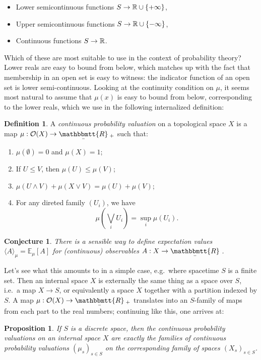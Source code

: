 \documentclass[11pt, oneside, article]{memoir}
\theoremstyle{plain}
\newtheorem{proposition}[theorem]{Proposition}
\newtheorem{conjecture}[theorem]{Conjecture}
\theoremstyle{definition}
\newtheorem{definition}[theorem]{Definition}
\theoremstyle{remark}
\newcommand{\ubar}[1]{\underaccent{\bar}{#1}}
\newcommand{\internal}[1]{\raisebox{-.03ex}{$\mathbbmtt{#1}$}}
\newcommand{\hs}{\hspace{1.1pt}}
\newcommand{\tRR}{\internal{R}\hs}
\newcommand{\tLR}{\ubar{\tRR}\hs}
\begin{document}
\begin{itemize}
\item Lower semicontinuous functions $S \to \mathbb{R} \cup \{+\infty\}$,
\item Upper semicontinuous functions $S \to \mathbb{R} \cup \{-\infty\}$,
\item Continuous functions $S \to \mathbb{R}$.
\end{itemize}

Which of these are most suitable to use in the context of probability theory? Lower reals are easy to bound from below, which matches up with the fact that membership in an open set is easy to witness: the indicator function of an open set is lower semi-continuous. Looking at the continuity condition on $\mu$, it seems most natural to assume that $\mu(x)$ is easy to bound from below, corresponding to the lower reals, which we use in the following internalized definition:

\begin{definition}
A \emph{continuous probability valuation} on a topological space $X$ is a map $\mu : \Open{X} \to \tLR_+$ such that:
\begin{enumerate}
\item $\mu(\emptyset) = 0$ and $\mu(X) = 1$;
\item If $U\leq V$, then $\mu(U) \leq \mu(V)$;
\item $\mu(U \land V) + \mu(X \lor V) = \mu(U) + \mu(V)$;
\item For any direted family $(U_i)$, we have
\[
	\mu\left( \bigvee_i U_i \right) = \sup_i \mu(U_i).
\]
\end{enumerate}
\end{definition}

\begin{conjecture}
There is a sensible way to define expectation values $\langle A \rangle_\mu = \mathbb{E}_\mu[A]$ for (continuous) observables $A : X \to \tLR$.
\end{conjecture}

Let's see what this amounts to in a simple case, e.g.~where spacetime $S$ is a finite set. Then an internal space $X$ is externally the same thing as a space over $S$, i.e.~a map $X\to S$, or equivalently a space $X$ together with a partition indexed by $S$. A map $\mu : \Open{X} \to \tLR_+$ translates into an $S$-family of maps from each part to the real numbers; continuing like this, one arrives at:

\begin{proposition}
If $S$ is a discrete space, then the continuous probability valuations on an internal space $X$ are exactly the families of continuous probability valuations $(\mu_s)_{s\in S}$ on the corresponding family of spaces $(X_s)_{s\in S}$.
\end{proposition}
\end{document}
